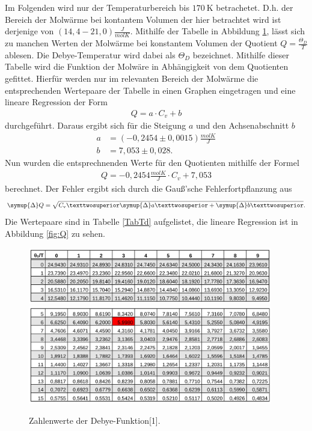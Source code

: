Im Folgenden wird nur der Temperaturbereich bis $\SI{170}{\kelvin}$ betrachetet. D.h. der Bereich der Molwärme 
bei kontantem Volumen der hier betrachtet wird ist derjenige von $(14,4-21,0) \frac{\si{J}}{\si{mol K}}$.
Mithilfe der Tabelle in Abbildung \ref{fig:Td}, lässt sich zu manchen Werten der Molwärme bei konstantem Volumen
der Quotient $Q=\frac{\Theta_{\si{D}}}{T}$ ablesen. Die Debye-Temperatur wird dabei als $\Theta_{\si{D}}$ 
bezeichnet. Mithilfe dieser Tabelle wird die Funktion 
der Molwäre in Abhängigkeit von dem Quotienten gefittet. Hierfür werden nur im relevanten Bereich der 
Molwärme die entsprechenden Wertepaare der Tabelle in einen Graphen eingetragen und eine lineare Regression 
der Form 
\begin{align*}
    Q = a \cdot C_{\si{v}} + b
\end{align*}
durchgeführt. Daraus ergibt sich für die Steigung $a$ und den Achsenabschnitt $b$
\begin{align*}
    a &= (-0,2454 \pm 0,0015) \frac{\si{molK}}{\si{J}}\\
    b &= 7,053 \pm 0,028.
\end{align*}
Nun wurden die entsprechnenden Werte für den Quotienten mithilfe der Formel 
\begin{align*}
    Q = - 0,2454\frac{\si{molK}}{\si{J}} \cdot C_{\si{v}} + 7,053
\end{align*}
berechnet. Der Fehler ergibt sich durch die Gauß'sche Fehlerfortpflanzung aus
\begin{equation*}
    \symup{\Delta} Q = \sqrt{C_{\si{v}}² \symup{\Delta}a² + \symup{\Delta}b²}.
\end{equation*}
Die Wertepaare sind in Tabelle \ref{TabTd} aufgelistet, die lineare Regression ist in Abbildung 
\ref{fig:Q} zu sehen. 
 
\begin{figure}
  \centering
  \includegraphics[width=0.95\textwidth]{Td1.png}
  \includegraphics[width=0.95\textwidth]{Td2.png}
  \caption{Zahlenwerte der Debye-Funktion[1].}
  \label{fig:Td}
\end{figure}
\FloatBarrier

